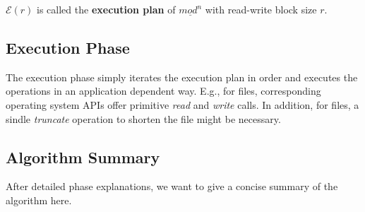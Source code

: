\documentclass[english, 10pt, openright, twocolumn, landscape, twoside, notitlepage, a4paper, pdftex]		
{article}
\begin{document}
$\mathcal{E}(r)$ is called the \textbf{execution plan} of $\underline{mod^{n}}$ with read-write block size $r$.

\subsection{Execution Phase}%
\label{sec:ExecutionPhase}%

The execution phase simply iterates the execution plan in order and executes the operations in an application dependent way. E.g., for files, corresponding operating system APIs offer primitive \emph{read} and \emph{write} calls. In addition, for files, a sindle \emph{truncate} operation to shorten the file might be necessary.

\subsection{Algorithm Summary}%
\label{sec:AlgorithmSummary}%

After detailed phase explanations, we want to give a concise summary of the algorithm here.
\end{document}
